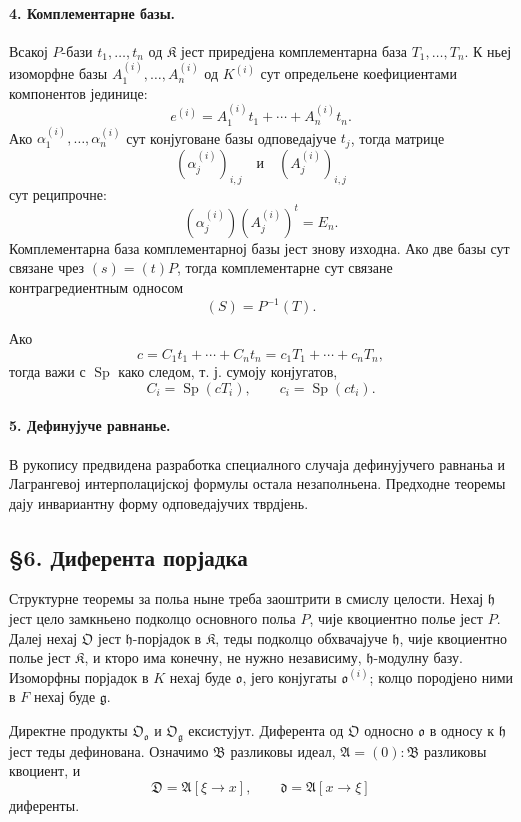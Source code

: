 ﻿\documentclass[11pt]{article}
\begin{document}
\paragraph{4. Комплементарне базы.}
Всакој \(P\)-бази \(t_1,\ldots,t_n\) од \(\mathfrak K\) јест приредјена комплементарна база \(T_1,\ldots,T_n\). К ньеј изоморфне базы \(A_1^{(i)},\ldots,A_n^{(i)}\) од \(K^{(i)}\) сут определьене коефициентами компонентов јединице:
\[
        e^{(i)}=A_1^{(i)}t_1+
        \cdots+A_n^{(i)}t_n.
\]
Ако \(\alpha_1^{(i)},\ldots,\alpha_n^{(i)}\) сут конјуговане базы одповедајуче \(t_j\), тогда матрице
\[
        (\alpha_j^{(i)})_{i,j}
        \quad\text{и}\quad
        (A_j^{(i)})_{i,j}
\]
сут реципрочне:
\[
        (\alpha_j^{(i)})(A_j^{(i)})^{t}=E_n.
\]
Комплементарна база комплементарној базы јест знову изходна. Ако две базы сут связане чрез \((s)=(t)P\), тогда комплементарне сут связане контрагредиентным односом
\[
        (S)=P^{-1}(T).
\]

Ако
\[
        c=C_1t_1+
        \cdots+C_nt_n
        =c_1T_1+
        \cdots+c_nT_n,
\]
тогда важи с \(\operatorname{Sp}\) како следом, т. ј. сумоју конјугатов,
\[
        C_i=\operatorname{Sp}(cT_i),
        \qquad
        c_i=\operatorname{Sp}(ct_i).
\]

\paragraph{5. Дефинујуче равнанье.}
В рукопису предвидена разработка специалного случаја дефинујучего равнаньа и Лагрангевој интерполацијској формулы остала незаполньена. Предходне теоремы дају инвариантну форму одповедајучих тврдјень.

\subsection*{§6. Диферента порјадка}

Структурне теоремы за польа ныне треба заоштрити в смислу целости. Нехај \(\mathfrak h\) јест цело замкньено подколцо основного польа \(P\), чије квоциентно полье јест \(P\). Далеј нехај \(\mathfrak O\) јест \(\mathfrak h\)-порјадок в \(\mathfrak K\), теды подколцо обхвачајуче \(\mathfrak h\), чије квоциентно полье јест \(\mathfrak K\), и кторо има конечну, не нужно независиму, \(\mathfrak h\)-модулну базу. Изоморфны порјадок в \(K\) нехај буде \(\mathfrak o\), јего конјугаты \(\mathfrak o^{(i)}\); колцо породјено ними в \(F\) нехај буде \(\mathfrak g\).

Директне продукты \(\mathfrak O_{\mathfrak o}\) и \(\mathfrak O_{\mathfrak g}\) ексистујут. Диферента од \(\mathfrak O\) односно \(\mathfrak o\) в односу к \(\mathfrak h\) јест теды дефинована. Означимо \(\mathfrak B\) разликовы идеал, \(\mathfrak A=(0):\mathfrak B\) разликовы квоциент, и
\[
        \mathfrak D=\mathfrak A[\xi\to x],
        \qquad
        \mathfrak d=\mathfrak A[x\to\xi]
\]
диференты.
\end{document}
